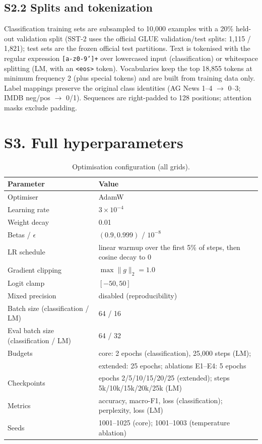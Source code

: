 \documentclass[10pt,a4paper]{article}
\begin{document}
\subsection*{S2.2 Splits and tokenization}
Classification training sets are subsampled to 10{,}000 examples with a 20\%
held-out validation split (SST-2 uses the official GLUE validation/test splits:
1{,}115 / 1{,}821); test sets are the frozen official test partitions. Text is
tokenised with the regular expression \texttt{[a-z0-9']+} over lowercased input
(classification) or whitespace splitting (LM, with an \texttt{<eos>} token).
Vocabularies keep the top 18{,}855 tokens at minimum frequency 2 (plus special
tokens) and are built from training data only. Label mappings preserve the
original class identities (AG News 1--4 $\to$ 0--3; IMDB neg/pos $\to$ 0/1).
Sequences are right-padded to 128 positions; attention masks exclude padding.

\section*{S3. Full hyperparameters}\label{sup:hyper}
\begin{table}[H]
  \centering
  \caption{Optimisation configuration (all grids).}
  \small
  \begin{tabular*}{\textwidth}{@{\extracolsep{\fill}} l l}
    \toprule
    \textbf{Parameter} & \textbf{Value} \\
    \midrule
    Optimiser & AdamW \cite{loshchilov2019} \\
    Learning rate & $3 \times 10^{-4}$ \\
    Weight decay & 0.01 \\
    Betas / $\epsilon$ & $(0.9, 0.999)$ / $10^{-8}$ \\
    LR schedule & linear warmup over the first 5\% of steps, then cosine decay to 0 \\
    Gradient clipping & $\max\|g\|_2 = 1.0$ \\
    Logit clamp & $[-50, 50]$ \\
    Mixed precision & disabled (reproducibility) \\
    Batch size (classification / LM) & 64 / 16 \\
    Eval batch size (classification / LM) & 64 / 32 \\
    \midrule
    Budgets & core: 2 epochs (classification), 25{,}000 steps (LM); \\
            & extended: 25 epochs; ablations E1--E4: 5 epochs \\
    Checkpoints & epochs 2/5/10/15/20/25 (extended); steps 5k/10k/15k/20k/25k (LM) \\
    Metrics & accuracy, macro-F1, loss (classification); perplexity, loss (LM) \\
    Seeds & 1001--1025 (core); 1001--1003 (temperature ablation) \\
    \bottomrule
  \end{tabular*}
\end{table}
\end{document}
